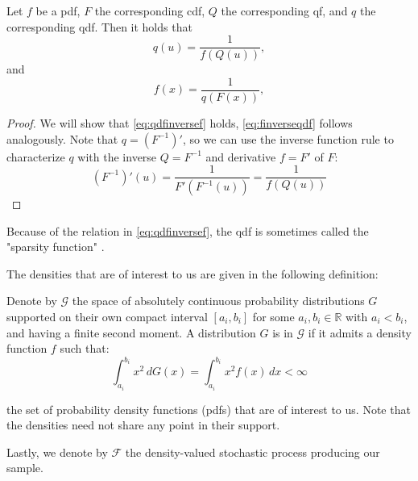 \begin{lemma}
\label{lemma:f eq inverse qdf}
    Let \(f\) be a pdf, \(F\) the corresponding cdf, \(Q\) the corresponding qf, and
    \(q\) the corresponding qdf. Then it holds that
    \begin{equation}
    \label{eq:qdfinversef}
        {q}(u) = \frac{1}{{f}({Q}(u))},
    \end{equation}
    and
    \begin{equation}
    \label{eq:finverseqdf}
        {f}(x) = \frac{1}{{q}({F}(x))},
    \end{equation}
\end{lemma}
\begin{proof}
    We will show that \eqref{eq:qdfinversef} holds, \eqref{eq:finverseqdf} follows
    analogously. Note that \( q = (F^{-1})' \), so we can use the inverse function
    rule to characterize \(q \) with the inverse $Q = F^{-1}$ and derivative $f = F'$
    of \( F \):
    \begin{equation}
    \label{eq:proof_qdfinversef}
        (F^{-1})'(u) = \frac{1}{{F'}({F^{-1}}(u))} = \frac{1}{{f}({Q}(u))}
    \end{equation}
\end{proof}
Because of the relation in \eqref{eq:qdfinversef}, the qdf is sometimes called the
"sparsity function" \parencite[cf.][]{Tukey1965}.

The densities that are of interest to us are given in the following definition:
\begin{definition}
    \label{def:spaceD}
    Denote by \( \mathcal{G} \) the space of absolutely continuous probability
    distributions \( G \) supported on their own compact interval \( [a_i, b_i] \)
    for some \( a_i, b_i \in \mathbb{R} \) with \( a_i < b_i \), and having a finite
    second moment. A distribution \( G \) is in \( \mathcal{G} \) if it admits a
    density function \( f \) such that:
    \[
        \int_{a_i}^{b_i} x^2 \, dG(x) = \int_{a_i}^{b_i} x^2 f(x) \, dx < \infty
    \]
\end{definition}
the set of probability density functions (pdfs) that are of interest to us. Note that
the densities need not share any point in their support.

Lastly, we denote by $\mathcal{F}$ the density-valued stochastic process producing our
sample.

